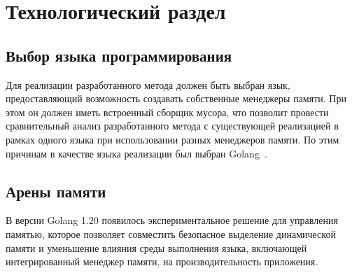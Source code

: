 \chapter{Технологический раздел}



\section{Выбор языка программирования}

Для реализации разработанного метода должен быть выбран язык, предоставляющий возможность создавать собственные менеджеры памяти. При этом он должен иметь встроенный сборщик мусора, что позволит провести сравнительный анализ разработанного метода с существующей реализацией в рамках одного языка при использовании разных менеджеров памяти. По этим причинам в качестве языка реализации был выбран Golang~\cite{golang}.


\clearpage
\section{Арены памяти}

В версии Golang 1.20 появилось экспериментальное решение для управления памятью, которое позволяет совместить безопасное выделение динамической памяти и уменьшение влияния среды выполнения языка, включающей интегрированный менеджер памяти, на производительность приложения.



